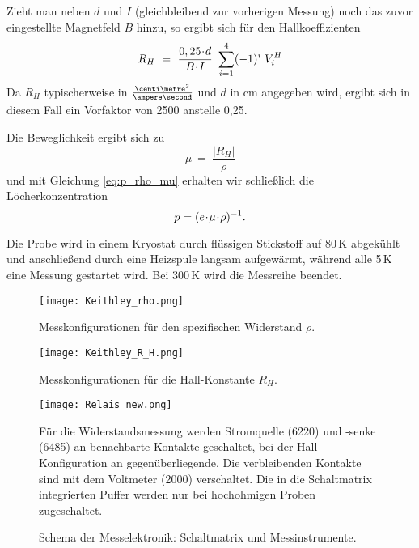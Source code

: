 Zieht man neben $d$ und $I$ (gleichbleibend zur vorherigen Messung) noch das zuvor eingestellte Magnetfeld $B$ hinzu, so ergibt sich für den Hallkoeffizienten 
\begin{equation}
R_H ~=~ \frac{0,25 \!\cdot\! d}{B \!\cdot\! I} ~ \sum\limits_{i=1}^4 (-1)^i \; V^H_i
\end{equation}
Da $R_H$ typischerweise in $\tfrac{\centi\metre^3}{\ampere\second}$ und $d$ in cm angegeben wird, ergibt sich in diesem Fall ein Vorfaktor von 2500 anstelle 0,25.

Die Beweglichkeit ergibt sich zu
\begin{equation}
\mu ~=~ \frac{|R_H|}{\rho}
\end{equation}
und mit Gleichung \eqref{eq:p_rho_mu} erhalten wir schließlich die Löcherkonzentration
\begin{equation}
p = (e \!\cdot\! \mu \!\cdot\! \rho)^{-1}.
\end{equation}

Die Probe wird in einem Kryostat durch flüssigen Stickstoff auf 80\,K abgekühlt und anschließend durch eine Heizspule langsam aufgewärmt, während alle 5\,K eine Messung gestartet wird. Bei 300\,K wird die Messreihe beendet.

\begin{figure}[p]
\centering
\texttt{[image: Keithley\_rho.png]}
\caption{Messkonfigurationen für den spezifischen Widerstand $\rho$. \cite[Fig. 3-3]{lit:manual}}
\label{fig:keithley1}
\end{figure}

\begin{figure}[p]
\centering
\texttt{[image: Keithley\_R\_H.png]}
\caption{Messkonfigurationen für die Hall-Konstante $R_H$. \cite[Fig. 3-4]{lit:manual}}
\label{fig:keithley2}
\end{figure}

\begin{figure}[p]
\centering
\texttt{[image: Relais\_new.png]}
\caption{Schema der Messelektronik: Schaltmatrix und Messinstrumente. \cite{lit:keithley}}
\vspace{1ex}
Für die Widerstandsmessung werden Stromquelle (6220) und -senke (6485) an benachbarte Kontakte geschaltet, bei der Hall-Konfiguration an gegenüberliegende. Die verbleibenden Kontakte sind mit dem Voltmeter (2000) verschaltet. Die in die Schaltmatrix integrierten Puffer werden nur bei hochohmigen Proben zugeschaltet.
\label{fig:keithley3}
\end{figure}

